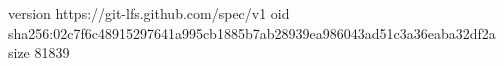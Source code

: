 version https://git-lfs.github.com/spec/v1
oid sha256:02c7f6c48915297641a995cb1885b7ab28939ea986043ad51c3a36eaba32df2a
size 81839
